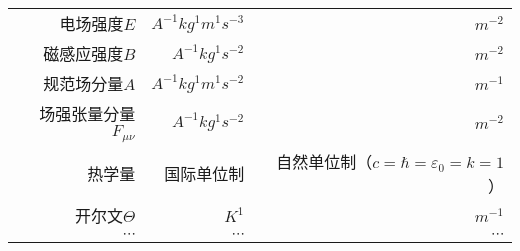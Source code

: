 \begin{table}[!htbp]
\begin{tabular*}{\hsize}{@{}@{\extracolsep{\fill}}rrr@{}}
				电场强度$E$						&	$A^{-1}kg^{1}m^{1}s^{-3}$				&	 $m^{-2}$					\\
				磁感应强度$B$					&	$A^{-1}kg^{1}s^{-2}$					&	 $m^{-2}$					\\
				规范场分量$A$					&	$A^{-1}kg^{1}m^{1}s^{-2}$				&	 $m^{-1}$					\\
				场强张量分量$F_{\mu\nu}$		&	$A^{-1}kg^{1}s^{-2}$					&	 $m^{-2}$					\\
				\midrule
				热学量							&				国际单位制					&	自然单位制（$c=\hbar=\varepsilon_0=k=1$）	\\
				\midrule
				开尔文$\varTheta$				&	$K^{1}$									&	 $m^{-1}$					\\
				$\cdots$						&	$\cdots$								&	 $\cdots$					\\




					
				\bottomrule
			\end{tabular*}
			
			\end{table}
        